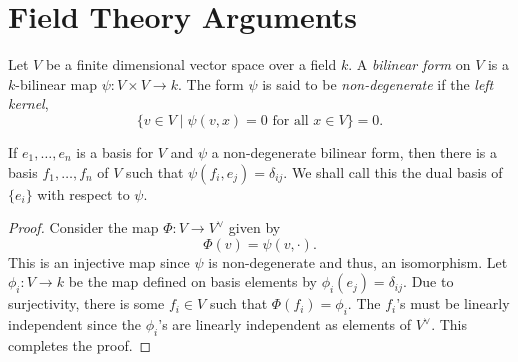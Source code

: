 \section{Field Theory Arguments}

\begin{definition}
    Let $V$ be a finite dimensional vector space over a field $k$. A \emph{bilinear form} on $V$ is a $k$-bilinear map $\psi: V\times V\to k$. The form $\psi$ is said to be \emph{non-degenerate} if the \emph{left kernel},
    \begin{equation*}
        \{v\in V\mid\psi(v, x) = 0\text{ for all }x\in V\} = 0.
    \end{equation*}
\end{definition}

\begin{lemma}
    If $e_1,\dots,e_n$ is a basis for $V$ and $\psi$ a non-degenerate bilinear form, then there is a basis $f_1,\dots,f_n$ of $V$ such that $\psi(f_i, e_j) = \delta_{ij}$. We shall call this the dual basis of $\{e_i\}$ with respect to $\psi$.
\end{lemma}
\begin{proof}
    Consider the map $\Phi: V\to V^\vee$ given by 
    \begin{equation*}
        \Phi(v) = \psi(v,\cdot).
    \end{equation*}
    This is an injective map since $\psi$ is non-degenerate and thus, an isomorphism. Let $\phi_i: V\to k$ be the map defined on basis elements by $\phi_i(e_j) = \delta_{ij}$. Due to surjectivity, there is some $f_i\in V$ such that $\Phi(f_i) = \phi_i$. The $f_i$'s must be linearly independent since the $\phi_i$'s are linearly independent as elements of $V^\vee$. This completes the proof.
\end{proof}

